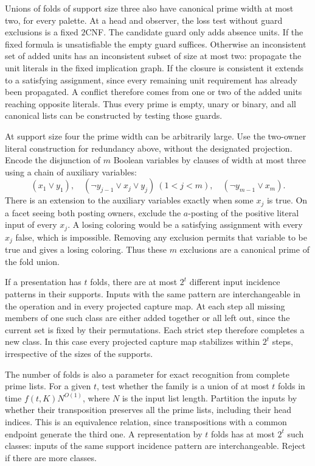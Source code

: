 Unions of folds of support size three also have
canonical prime width at most two, for every
palette. At a head and observer, the loss test
without guard exclusions is a fixed $2$CNF.
The candidate guard only adds absence units.
If the fixed formula is unsatisfiable the
empty guard suffices. Otherwise an inconsistent
set of added units has an inconsistent subset
of size at most two: propagate the unit literals
in the fixed implication graph. If the closure
is consistent it extends to a satisfying
assignment, since every remaining unit
requirement has already been propagated.
A conflict therefore comes from one or two
of the added units reaching opposite literals.
Thus every prime is empty, unary or binary,
and all canonical lists can be constructed
by testing those guards.

At support size four the prime width can be
arbitrarily large. Use the two-owner literal
construction for redundancy above, without
the designated projection. Encode the
disjunction of $m$ Boolean variables by
clauses of width at most three using a chain
of auxiliary variables:
\[
 (x_1\lor y_1),\quad
 (\neg y_{j-1}\lor x_j\lor y_j)\ (1<j<m),\quad
 (\neg y_{m-1}\lor x_m).
\]
There is an extension to the auxiliary
variables exactly when some $x_j$ is true.
On a facet seeing both posting owners, exclude
the $a$-posting of the positive literal input
of every $x_j$. A losing coloring would be a
satisfying assignment with every $x_j$ false,
which is impossible. Removing any exclusion
permits that variable to be true and gives
a losing coloring. Thus these $m$ exclusions
are a canonical prime of the fold union.

If a presentation has $t$ folds, there are at most $2^t$
different input incidence patterns in their supports. Inputs
with the same pattern are interchangeable in the operation
and in every projected capture map. At each step all missing
members of one such class are either added together or all
left out, since the current set is fixed by their permutations.
Each strict step therefore completes a new class. In this
case every projected capture map stabilizes within $2^t$
steps, irrespective of the sizes of the supports.

The number of folds is also a parameter for exact recognition
from complete prime lists. For a given $t$, test whether the
family is a union of at most $t$ folds in time
$f(t,K)N^{O(1)}$, where $N$ is the input list length. Partition
the inputs by whether their transposition preserves all the
prime lists, including their head indices. This is an
equivalence relation, since transpositions with a common
endpoint generate the third one. A representation by $t$
folds has at most $2^t$ such classes: inputs of the same
support incidence pattern are interchangeable. Reject if
there are more classes.

